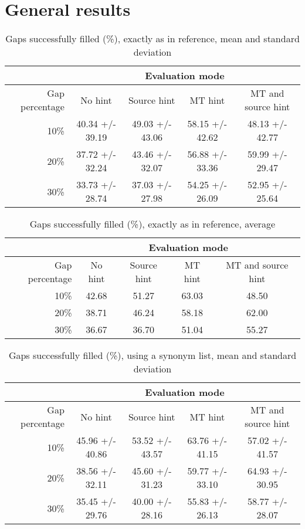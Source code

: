 \documentclass[11pt, oneside]{article}   	%
\begin{document}
\section{General results}

\begin{table}[H]
\centering
\begin{tabular}{|r |*{4}{c}|}
\hline
 &\multicolumn{4}{c|}{Evaluation mode}\\
\hline
Gap percentage & No hint & Source hint & MT hint & MT and source hint\\
\hline
10\%&40.34 +/- 39.19&49.03 +/- 43.06&58.15 +/- 42.62&48.13 +/- 42.77\\
20\%&37.72 +/- 32.24&43.46 +/- 32.07&56.88 +/- 33.36&59.99 +/- 29.47\\
30\%&33.73 +/- 28.74&37.03 +/- 27.98&54.25 +/- 26.09&52.95 +/- 25.64\\
\hline
\end{tabular}
\caption {Gaps successfully filled (\%), exactly as in reference, mean and standard deviation} \label{tab:title} 
\end{table}

\begin{table}[H]
\centering
\begin{tabular}{|r |*{4}{c}|}
\hline
 &\multicolumn{4}{c|}{Evaluation mode}\\
\hline
Gap percentage & No hint & Source hint & MT hint & MT and source hint\\
\hline
10\%&42.68&51.27&63.03&48.50\\
20\%&38.71&46.24&58.18&62.00\\
30\%&36.67&36.70&51.04&55.27\\
\hline
\end{tabular}
\caption {Gaps successfully filled (\%), exactly as in reference, average} \label{tab:title} 
\end{table}

\begin{table}[H]
\centering
\begin{tabular}{|r |*{4}{c}|}
\hline
 &\multicolumn{4}{c|}{Evaluation mode}\\
\hline
Gap percentage & No hint & Source hint & MT hint & MT and source hint\\
\hline
10\%&45.96 +/- 40.86&53.52 +/- 43.57&63.76 +/- 41.15&57.02 +/- 41.57\\
20\%&38.56 +/- 32.11&45.60 +/- 31.23&59.77 +/- 33.10&64.93 +/- 30.95\\
30\%&35.45 +/- 29.76&40.00 +/- 28.16&55.83 +/- 26.13&58.77 +/- 28.07\\
\hline
\end{tabular}
\caption {Gaps successfully filled (\%), using a synonym list, mean and standard deviation} \label{tab:title} 
\end{table}
\end{document}
